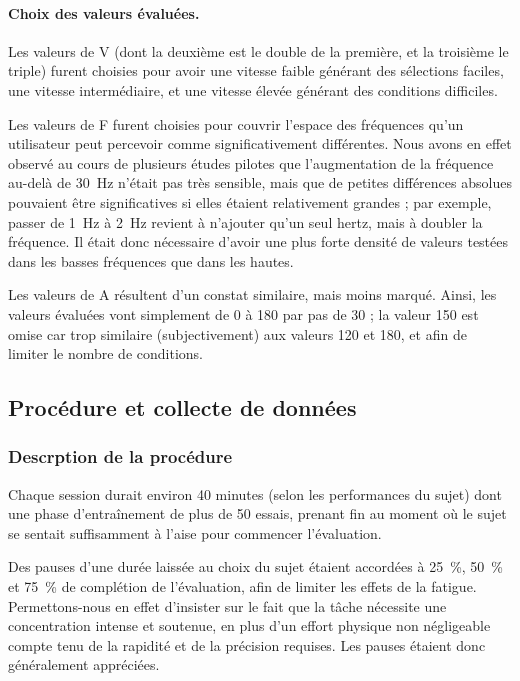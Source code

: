 	\paragraph{Choix des valeurs évaluées.}
	Les valeurs de V (dont la deuxième est le double de la première, et la troisième le triple) furent choisies pour avoir une vitesse faible générant des sélections faciles, une vitesse intermédiaire, et une vitesse élevée générant des conditions difficiles.
	
	Les valeurs de F furent choisies pour couvrir l'espace des fréquences qu'un utilisateur peut percevoir comme significativement différentes. Nous avons en effet observé au cours de plusieurs études pilotes que l'augmentation de la fréquence au-delà de 30~Hz n'était pas très sensible, mais que de petites différences absolues pouvaient être significatives si elles étaient relativement grandes ; par exemple, passer de 1~Hz à 2~Hz revient à n'ajouter qu'un seul hertz, mais à doubler la fréquence. Il était donc nécessaire d'avoir une plus forte densité de valeurs testées dans les basses fréquences que dans les hautes.
	
	Les valeurs de A résultent d'un constat similaire, mais moins marqué. Ainsi, les valeurs évaluées vont simplement de 0\textdegree{} à 180\textdegree{} par pas de 30\textdegree{} ; la valeur 150\textdegree{} est omise car trop similaire (subjectivement) aux valeurs 120\textdegree{} et 180\textdegree{}, et afin de limiter le nombre de conditions.

	\subsection{Procédure et collecte de données}
	\subsubsection{Descrption de la procédure}
	Chaque session durait environ 40 minutes (selon les performances du sujet) dont une phase d'entraînement de plus de 50 essais, prenant fin au moment où le sujet se sentait suffisamment à l'aise pour commencer l'évaluation.
	
	Des pauses d'une durée laissée au choix du sujet étaient accordées à 25~\%{}, 50~\%{} et 75~\%{} de complétion de l'évaluation, afin de limiter les effets de la fatigue. Permettons-nous en effet d'insister sur le fait que la tâche nécessite une concentration intense et soutenue, en plus d'un effort physique non négligeable compte tenu de la rapidité et de la précision requises. Les pauses étaient donc généralement appréciées.
	
